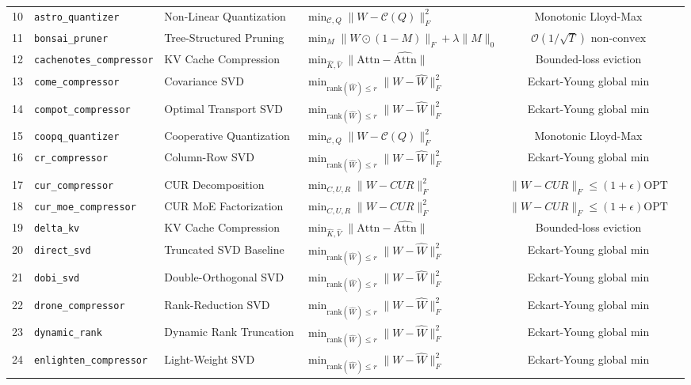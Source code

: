 \begin{center}
\begin{longtable}{rlllcc}
10 & \texttt{astro\_quantizer} & Non-Linear Quantization & $\min_{\mathcal{C}, Q} \|W - \mathcal{C}(Q)\|_F^2$ & Monotonic Lloyd-Max \\
11 & \texttt{bonsai\_pruner} & Tree-Structured Pruning & $\min_M \|W \odot (1-M)\|_F + \lambda \|M\|_0$ & $\mathcal{O}(1/\sqrt{T}) \text{ non-convex}$ \\
12 & \texttt{cachenotes\_compressor} & KV Cache Compression & $\min_{\hat{K},\hat{V}} \|\text{Attn} - \hat{\text{Attn}}\|$ & Bounded-loss eviction \\
13 & \texttt{come\_compressor} & Covariance SVD & $\min_{\text{rank}(\hat{W})\le r} \|W - \hat{W}\|_F^2$ & Eckart-Young global min \\
14 & \texttt{compot\_compressor} & Optimal Transport SVD & $\min_{\text{rank}(\hat{W})\le r} \|W - \hat{W}\|_F^2$ & Eckart-Young global min \\
15 & \texttt{coopq\_quantizer} & Cooperative Quantization & $\min_{\mathcal{C}, Q} \|W - \mathcal{C}(Q)\|_F^2$ & Monotonic Lloyd-Max \\
16 & \texttt{cr\_compressor} & Column-Row SVD & $\min_{\text{rank}(\hat{W})\le r} \|W - \hat{W}\|_F^2$ & Eckart-Young global min \\
17 & \texttt{cur\_compressor} & CUR Decomposition & $\min_{C,U,R} \|W - C U R\|_F^2$ & $\|W - CUR\|_F \le (1+\epsilon)\text{OPT}$ \\
18 & \texttt{cur\_moe\_compressor} & CUR MoE Factorization & $\min_{C,U,R} \|W - C U R\|_F^2$ & $\|W - CUR\|_F \le (1+\epsilon)\text{OPT}$ \\
19 & \texttt{delta\_kv} & KV Cache Compression & $\min_{\hat{K},\hat{V}} \|\text{Attn} - \hat{\text{Attn}}\|$ & Bounded-loss eviction \\
20 & \texttt{direct\_svd} & Truncated SVD Baseline & $\min_{\text{rank}(\hat{W})\le r} \|W - \hat{W}\|_F^2$ & Eckart-Young global min \\
21 & \texttt{dobi\_svd} & Double-Orthogonal SVD & $\min_{\text{rank}(\hat{W})\le r} \|W - \hat{W}\|_F^2$ & Eckart-Young global min \\
22 & \texttt{drone\_compressor} & Rank-Reduction SVD & $\min_{\text{rank}(\hat{W})\le r} \|W - \hat{W}\|_F^2$ & Eckart-Young global min \\
23 & \texttt{dynamic\_rank} & Dynamic Rank Truncation & $\min_{\text{rank}(\hat{W})\le r} \|W - \hat{W}\|_F^2$ & Eckart-Young global min \\
24 & \texttt{enlighten\_compressor} & Light-Weight SVD & $\min_{\text{rank}(\hat{W})\le r} \|W - \hat{W}\|_F^2$ & Eckart-Young global min \\

\end{longtable}
\end{center}
